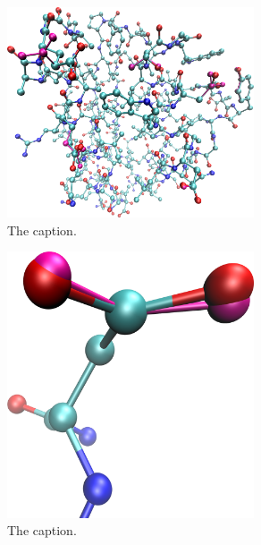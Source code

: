 \begin{figure}[h]
  \centering
  \includegraphics[width=0.65\textwidth,height=0.3\textheight,keepaspectratio]{figures/mutation_side_chain_images/1brs_all.png}
  \caption{The caption.}
  \label{figure:computational_mutation_scanning/figname}
\end{figure}

\begin{figure}[h]
  \centering
  \includegraphics[width=0.65\textwidth,height=0.3\textheight,keepaspectratio]{figures/mutation_side_chain_images/1brs_chain_d_35.png}
  \caption{The caption.}
  \label{figure:computational_mutation_scanning/figname}
\end{figure}

